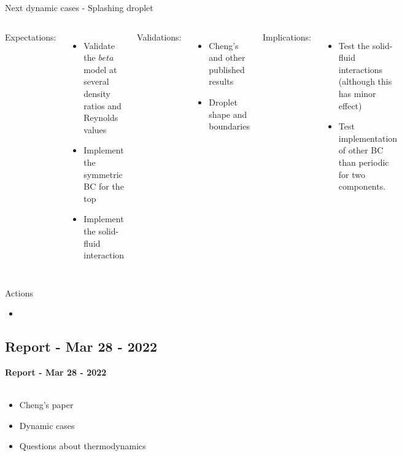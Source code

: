 \documentclass[8pt]{beamer}
\begin{document}
	\begin{frame}{Next dynamic cases - Splashing droplet}
		
		\begin{columns}
			
			Expectations:
			\begin{itemize}
				\item Validate the $beta$ model at several density ratios and Reynolds values
				\item Implement the symmetric BC for the top
				\item Implement the solid-fluid interaction
			\end{itemize}
			
			Validations:
			\begin{itemize}
				\item Cheng's and other published results
				\item Droplet shape and boundaries
			\end{itemize}
			Implications:
			\begin{itemize}
				\item Test the solid-fluid interactions (although this has minor effect)
				\item Test implementation of other BC than periodic for two components.
			\end{itemize}
		\end{columns}
	\end{frame}
	
	
	\begin{frame}{Actions}
		\begin{itemize}
			\item
		\end{itemize}
	\end{frame}

	\subsection{Report - Mar 28 - 2022}
	\label{}
	\justifying
	\begin{frame}{}
		\textbf{Report - Mar 28 - 2022}\\~\\
		\begin{itemize}
			
			\item Cheng's paper
			\item Dynamic cases
			\item Questions about thermodynamics
			
		\end{itemize}
	\end{frame}
\end{document}
